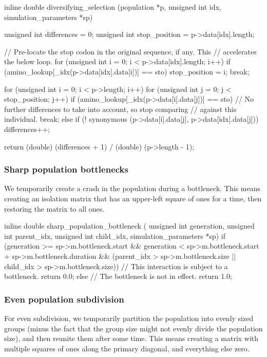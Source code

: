 \documentclass{article}
\begin{document}
\begin{ccode}
inline double diversifying_selection (population *p, unsigned int idx, simulation_parameters *sp) {
  unsigned int differences = 0;
  unsigned int stop_position = p->data[idx].length;

  // Pre-locate the stop codon in the original sequence, if any. This
  // accelerates the below loop.
  for (unsigned int i = 0; i < p->data[idx].length; i++)
    if (amino_lookup[_idx(p->data[idx].data[i])] == sto) {
      stop_position = i;
      break;
    }

  for (unsigned int i = 0; i < p->length; i++)
    for (unsigned int j = 0; j < stop_position; j++)
      if (amino_lookup[_idx(p->data[i].data[j])] == sto)
	// No further differences to take into account, so stop comparing
	// against this individual.
	break;
      else if (! synonymous (p->data[i].data[j], p->data[idx].data[j]))
	differences++;

  return (double) (differences + 1) / (double) (p->length - 1);
}
\end{ccode}

      \subsubsection{Sharp population bottlenecks}

	We temporarily create a crash in the population during a bottleneck.
	This means creating an isolation matrix that has an upper-left square of
	ones for a time, then restoring the matrix to all ones.

\begin{ccode}
inline double sharp_population_bottleneck (
    unsigned int generation, unsigned int parent_idx,
    unsigned int child_idx, simulation_parameters *sp) {
  if (generation >= sp->m.bottleneck.start &&
      generation < sp->m.bottleneck.start + sp->m.bottleneck.duration &&
      (parent_idx > sp->m.bottleneck.size ||
       child_idx > sp->m.bottleneck.size))
    // This interaction is subject to a bottleneck.
    return 0.0;
  else
    // The bottleneck is not in effect.
    return 1.0;
}
\end{ccode}

      \subsubsection{Even population subdivision}

	For even subdivision, we temporarily partition the population into
	evenly sized groups (minus the fact that the group size might not evenly
	    divide the population size), and then reunite them after some time.
	This means creating a matrix with multiple squares of ones along the
	primary diagonal, and everything else zero.
\end{document}
